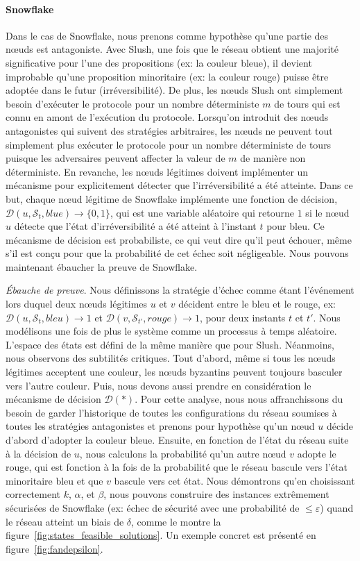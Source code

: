 \documentclass[letterpaper,twocolumn,10pt]{article}
\theoremstyle{definition}
\begin{document}
\paragraph{Snowflake}

Dans le cas de Snowflake, nous prenons comme hypothèse qu'une partie des nœuds est antagoniste. Avec Slush, une
fois que le réseau obtient une majorité significative pour l'une des propositions (ex: la couleur bleue), il devient
improbable qu'une proposition minoritaire (ex: la couleur rouge) puisse être adoptée dans le futur (irréversibilité).
De plus, les nœuds Slush ont simplement besoin d'exécuter le protocole pour un nombre déterministe $m$ de tours qui
est connu en amont de l'exécution du protocole. Lorsqu'on introduit des nœuds antagonistes qui suivent des stratégies
arbitraires, les nœuds ne peuvent tout simplement plus exécuter le protocole pour un nombre déterministe de tours puisque
les adversaires peuvent affecter la valeur de $m$ de manière non déterministe. En revanche, les nœuds légitimes doivent
implémenter un mécanisme pour explicitement détecter que l'irréversibilité a été atteinte. Dans ce but, 
chaque nœud légitime de Snowflake implémente une fonction de décision, $\mathcal{D}(u, \mathcal{S}_t, blue) \rightarrow \{0, 1\}$,
qui est une variable aléatoire qui retourne $1$ si le nœud $u$ détecte que l'état d'irréversibilité a été atteint à
l'instant $t$ pour bleu. Ce mécanisme de décision est probabiliste, ce qui veut dire qu'il peut échouer, même s'il est
conçu pour que la probabilité de cet échec soit négligeable. Nous pouvons maintenant ébaucher la preuve de Snowflake.

\noindent \emph{Ébauche de preuve}. Nous définissons la stratégie d'échec comme étant l'événement lors duquel deux
nœuds légitimes $u$ et $v$ décident entre le bleu et le rouge, ex: $\mathcal{D}(u, \mathcal{S}_t, bleu) \rightarrow 1$
et $\mathcal{D}(v, \mathcal{S}_{t'}, rouge) \rightarrow 1$, pour deux instants $t$ et $t'$. Nous modélisons une fois de
plus le système comme un processus à temps aléatoire. L'espace des états est défini de la même manière que pour Slush.
Néanmoins, nous observons des subtilités critiques. Tout d'abord, même si tous les nœuds légitimes acceptent une
couleur, les nœuds byzantins peuvent toujours basculer vers l'autre couleur. Puis, nous devons aussi prendre en
considération le mécanisme de décision $\mathcal{D}(*)$. Pour cette analyse, nous nous affranchissons du besoin de
garder l'historique de toutes les configurations du réseau soumises à toutes les stratégies antagonistes et prenons pour
hypothèse qu'un nœud $u$ décide d'abord d'adopter la couleur bleue. Ensuite, en fonction de l'état du réseau suite à la
décision de $u$, nous calculons la probabilité qu'un autre nœud $v$ adopte le rouge, qui est fonction à la fois de la
probabilité que le réseau bascule vers l'état minoritaire bleu et que $v$ bascule vers cet état.
Nous démontrons qu'en choisissant correctement $k$, $\alpha$, et $\beta$, nous pouvons construire des instances
extrêmement sécurisées de Snowflake (ex: échec de sécurité avec une probabilité de $\leq \varepsilon$) quand le réseau
atteint un biais de $\delta$, comme le montre la figure~\ref{fig:states_feasible_solutions}. Un exemple concret est
présenté en figure~\ref{fig:fandepsilon}.
\end{document}
